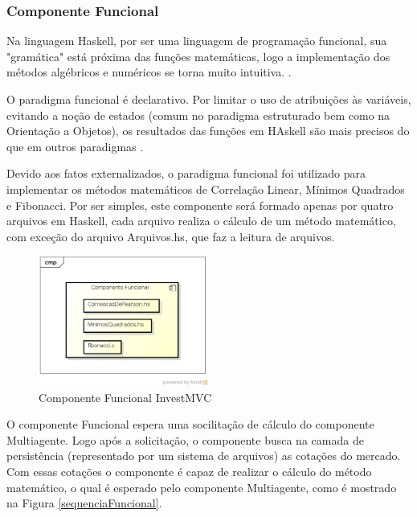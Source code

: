 \subsubsection{Componente Funcional}
Na linguagem Haskell, por ser uma linguagem de programação funcional, sua "gramática" está próxima das funções matemáticas, logo a implementação dos métodos algébricos e numéricos se torna muito intuitiva. \cite{hoogle2013}.

O paradigma funcional é declarativo. Por limitar o uso de atribuições às variáveis, evitando a noção de estados (comum no paradigma  estruturado bem como na Orientação a Objetos), os resultados das funções em HAskell são mais precisos do que em outros paradigmas \cite{piponi2006}.

Devido aos fatos externalizados, o paradigma funcional foi utilizado para implementar os métodos matemáticos de Correlação Linear, Mínimos Quadrados e Fibonacci. Por ser simples, este componente será formado apenas por quatro arquivos em Haskell, cada arquivo realiza o cálculo de um método matemático, com exceção do arquivo  Arquivos.hs, que faz a leitura de arquivos.

\begin{figure}[H]
\centering
\includegraphics[width=0.5\textwidth]{figuras/componenteFuncional}
\caption{Componente Funcional InvestMVC} 
\label{componenteFuncional}
\end{figure}

O componente Funcional espera uma socilitação de cálculo do componente Multiagente. Logo após a solicitação, o componente busca na camada de persistência (representado por um sistema de arquivos) as cotações do mercado. Com essas cotações o componente é capaz de realizar o cálculo do método matemático, o qual é esperado pelo componente Multiagente, como é mostrado na Figura \ref{sequenciaFuncional}.

